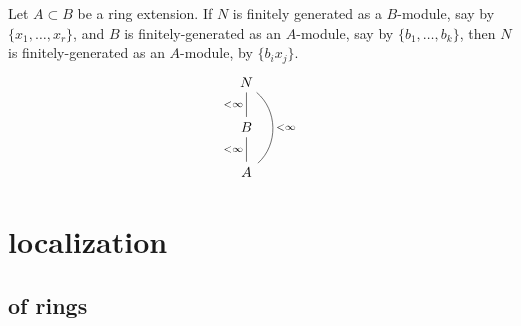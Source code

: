 \documentclass[12pt]{article}
\begin{document}
\begin{proposition}
	Let $A\subset B$ be a ring extension. If $N$ is finitely generated as a $B$-module, say by $\{x_1,\dots,x_r\}$, and $B$ is finitely-generated as an $A$-module, say by $\{b_1,\dots,b_k\}$, then $N$ is finitely-generated as an $A$-module, by $\{b_ix_j\}$.
	\begin{equation*}
\begin{tikzcd}
N                                                                              \\
B \arrow[u, "<\infty", no head]                                                \\
A \arrow[u, "<\infty", no head] \arrow[uu, "<\infty"', no head, bend right=49]
\end{tikzcd}
	\end{equation*}
\end{proposition}



\section{localization} %

\subsection{of rings} %
\end{document}
